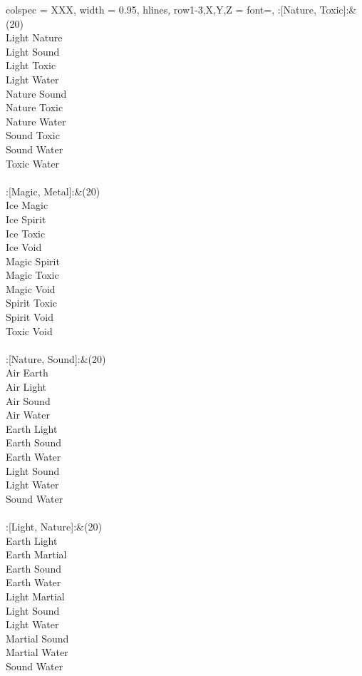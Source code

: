 \begin{longtblr}[
	caption = {2v2 Defending Resisted},
	label = {2v2-Defending-Resisted},
]{
	colspec = {XXX}, width = 0.95\linewidth,
	hlines,
	row{1-3,X,Y,Z} = {font=\bfseries},
}
	:[Nature, Toxic]:&{(20)\\
	Light Nature \\
	Light Sound \\
	Light Toxic \\
	Light Water \\
	Nature Sound \\
	Nature Toxic \\
	Nature Water \\
	Sound Toxic \\
	Sound Water \\
	Toxic Water \\
	}\\

	:[Magic, Metal]:&{(20)\\
	Ice Magic \\
	Ice Spirit \\
	Ice Toxic \\
	Ice Void \\
	Magic Spirit \\
	Magic Toxic \\
	Magic Void \\
	Spirit Toxic \\
	Spirit Void \\
	Toxic Void \\
	}\\

	:[Nature, Sound]:&{(20)\\
	Air Earth \\
	Air Light \\
	Air Sound \\
	Air Water \\
	Earth Light \\
	Earth Sound \\
	Earth Water \\
	Light Sound \\
	Light Water \\
	Sound Water \\
	}\\

	:[Light, Nature]:&{(20)\\
	Earth Light \\
	Earth Martial \\
	Earth Sound \\
	Earth Water \\
	Light Martial \\
	Light Sound \\
	Light Water \\
	Martial Sound \\
	Martial Water \\
	Sound Water \\
	}\\


\end{longtblr}
